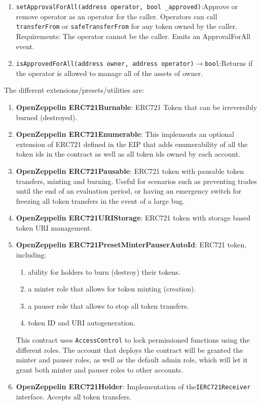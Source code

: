 \begin{enumerate}
\begin{enumerate}
	\item\verb|setApprovalForAll(address operator, bool _approved)|:\linebreak Approve or remove operator as an operator for the caller. Operators can call \verb|transferFrom| or \verb|safeTransferFrom| for any token owned by the caller. Requirements: The operator cannot be the caller. Emits an ApprovalForAll event.
	\item\verb|isApprovedForAll(address owner, address operator)|$\rightarrow$\verb|bool|:\linebreak Returns if the operator is allowed to manage all of the assets of owner.
	\end{enumerate}

The different extensions/presets/utilities are:
    \begin{enumerate}
    \item\textbf{OpenZeppelin ERC721Burnable}: ERC721 Token that can be irreversibly burned (destroyed).
    \item\textbf{OpenZeppelin ERC721Enumerable}: This implements an optional extension of ERC721 defined in the EIP that adds enumerability of all the token ids in the contract as well as all token ids owned by each account.
    \item\textbf{OpenZeppelin ERC721Pausable}: ERC721 token with pausable token transfers, minting and burning. Useful for scenarios such as preventing trades until the end of an evaluation period, or having an emergency switch for freezing all token transfers in the event of a large bug.
    \item\textbf{OpenZeppelin ERC721URIStorage}: ERC721 token with storage based token URI management.
    \item\textbf{OpenZeppelin ERC721PresetMinterPauserAutoId}: ERC721 token, including:
        \begin{enumerate}
        \item ability for holders to burn (destroy) their tokens.
        \item a minter role that allows for token minting (creation).
        \item a pauser role that allows to stop all token transfers.
        \item token ID and URI autogeneration.
        \end{enumerate}
    This contract uses \verb|AccessControl| to lock permissioned functions using the different roles. The account that deploys the contract will be granted the minter and pauser roles, as well as the default admin role, which will let it grant both minter and pauser roles to other accounts.
    \item\textbf{OpenZeppelin ERC721Holder}: Implementation of the\linebreak\verb|IERC721Receiver| interface. Accepts all token transfers.
    \end{enumerate}


\end{enumerate}
